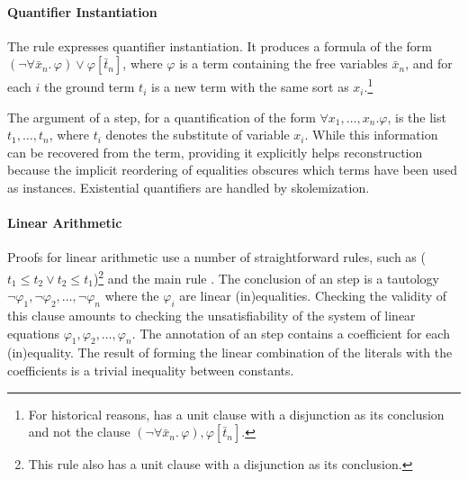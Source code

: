 \documentclass{scrartcl}
\begin{document}
\paragraph{Quantifier Instantiation}
The rule  expresses quantifier instantiation.
It produces a formula of the form $(\neg \forall \bar
x_n.\,\varphi) \lor \varphi[\bar t_n]$, where $\varphi$ is
a term containing the free variables $\bar x_n$, and for each $i$ the
ground term $t_i$ is a new term with the same sort as $x_i$.\footnote{
  For historical reasons,  has a unit clause with a disjunction
  as its conclusion and not the clause $(\neg \forall \bar x_n.\,\varphi), \varphi[\bar t_n]$.
}

The argument of a  step, for a quantification of the form $\forall x_1,\dots,x_n. \varphi$,  is the list $t_1,\dots, t_n$, where $t_i$ denotes the substitute of variable $x_i$. While this information can be recovered from the term,
providing it explicitly helps reconstruction because the implicit reordering of
equalities obscures which terms have been used as instances.
Existential quantifiers are handled by skolemization.


\paragraph{Linear Arithmetic}
Proofs for linear arithmetic use a number of straightforward rules,
such as  ($t_1 \leq t_2 \lor t_2 \leq t_1$)\footnote{
  This rule also has a unit clause with a disjunction as its conclusion.}
and the main rule .  The conclusion of an
 step is a tautology $\neg \varphi_1, \neg
\varphi_2, \dots, \neg \varphi_n$ where the $\varphi_i$ are linear
(in)equalities. Checking the validity of this clause amounts to
checking the unsatisfiability of the system of linear equations
$\varphi_1, \varphi_2, \dots, \varphi_n$.  The annotation of an
 step contains a coefficient for each (in)equality.
The result of forming the linear combination of the literals with
the coefficients is a trivial inequality between constants.
\end{document}

